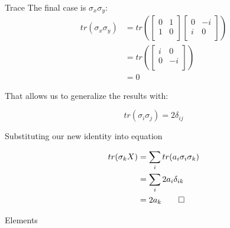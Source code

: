 \begin{answer}
\begin{answerpart}{Trace}
    The final case is $\sigma_x\sigma_y$:
    \begin{equation}
      \begin{split}
        tr(\sigma_x\sigma_y)
        &=
        tr\left(
        \begin{bmatrix}
          0 & 1\\
          1 & 0\\
        \end{bmatrix}
        \begin{bmatrix}
          0 & -i\\
          i & 0\\
        \end{bmatrix} \right)\\
        &=
        tr\left(\begin{bmatrix}
          i & 0\\
          0 & -i\\
        \end{bmatrix} \right)\\
        &= 0
      \end{split}
    \end{equation}

    That allows us to generalize the results with:
    
    \begin{equation}
      tr(\sigma_i\sigma_j) = 2\delta_{ij}
    \end{equation}

    Substituting our new identity into equation 
    
    \begin{equation}
      \begin{split}
        tr(\sigma_k X)
        &= \sum_i{tr(a_i\sigma_i\sigma_k)} \\
        &= \sum_i{2a_i\delta_{ik}} \\
        &= 2a_k
        \qed
      \end{split}
    \end{equation}

  \end{answerpart}



  \begin{answerpart}{Elements}


\end{answerpart}
\end{answer}
